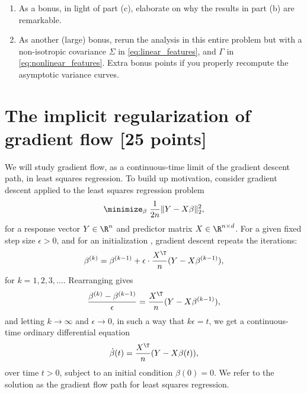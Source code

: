 \documentclass{article}
\begin{document}
\begin{enumerate}[label=(\alph*)]
\item As a bonus, in light of part (c), elaborate on why the results in part (b)
  are remarkable. 

\item As another (large) bonus, rerun the analysis in this entire problem but
  with a non-isotropic covariance $\Sigma$ in \eqref{eq:linear_features}, and
  $\Gamma$ in \eqref{eq:nonlinear_features}. Extra bonus points if you properly
  recompute the asymptotic variance curves. 
\end{enumerate}

\section{The implicit regularization of gradient flow [25 points]} 

\def\gf{\mathrm{gf}}
\def\ridge{\mathrm{ridge}}

We will study gradient flow, as a continuous-time limit of the gradient descent
path, in least squares regression. To build up motivation, consider gradient
descent applied to the least squares regression problem 
\[
\minimize_\beta \; \frac{1}{2n} \|Y - X\beta\|_2^2,
\]
for a response vector $Y \in \R^n$ and predictor matrix $X \in \R^{n \times
  d}$. For a given fixed step size $\epsilon>0$, and for an initialization
, gradient descent repeats the iterations:  
\[
\beta^{(k)} = \beta^{(k-1)} + \epsilon \cdot \frac{X^\T}{n} 
(Y - X \beta^{(k-1)}), 
\]
for $k=1,2,3,\ldots$. Rearranging gives
\[
\frac{\beta^{(k)} - \beta^{(k-1)}}{\epsilon} = \frac{X^\T}{n} (Y - X
\beta^{(k-1)}),  
\]
and letting $k \to \infty$ and $\epsilon \to 0$, in such a way that $k\epsilon =
t$, we get a continuous-time ordinary differential equation 
\begin{equation}
\label{eq:gradient_flow}
\dot\beta(t) = \frac{X^\T}{n} (Y - X \beta(t)),
\end{equation}
over time $t>0$, subject to an initial condition $\beta(0) = 0$. We refer to the
solution as the gradient flow path for least squares regression. 
\end{document}
